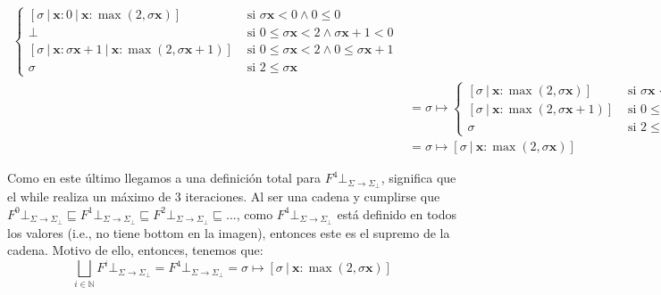 \documentclass{article}
\newcommand{\N}{\mathbb{N}}
\newcommand{\x}{\textbf{x}}
\newcommand{\supr}{\bigsqcup\limits}
\newcommand{\fleq}{\sqsubseteq}
\newcommand{\cdom}{\Sigma \to \Sigma_\bot}
\newcommand{\cfbot}{\bot_{\cdom}}
\begin{document}
\begin{equation*}
\begin{aligned}
\begin{cases}
                   [\sigma\ |\ \x : 0\ |\ \x : \max(2, \sigma\x)] &\text{ si } \sigma\x < 0 \land 0 \leq 0 \\ 
                   \bot &\text{ si }0 \leq \sigma\x < 2 \land \sigma\x+1 < 0 \\ 
                   [\sigma\ |\ \x : \sigma\x+1\ |\ \x : \max(2,\sigma\x+1)] &\text{ si }0 \leq \sigma\x < 2 \land 0 \leq \sigma\x+1 \\ 
                   \sigma &\text{ si }2 \leq \sigma\x
                 \end{cases} \\ 
                 &= \sigma \mapsto \begin{cases}
                   [\sigma\ |\ \x : \max(2, \sigma \x)] &\text{ si }\sigma \x < 0 \\ 
                   [\sigma\ |\ \x : \max(2, \sigma\x+1)] &\text{ si }0 \leq \sigma\x < 2 \\ 
                   \sigma &\text{ si }2 \leq \sigma\x 
                 \end{cases} \\ 
                 &= \sigma \mapsto [\sigma\ |\ \x : \max(2, \sigma\x)]
  \end{aligned}
\end{equation*}

Como en este último llegamos a una definición total para $F^4 \cfbot$, significa que el while realiza un máximo de $3$ iteraciones.
Al ser una cadena y cumplirse que $F^0 \cfbot \fleq F^1 \cfbot \fleq F^2 \cfbot \fleq \dots$, como $F^4 \cfbot$ está definido en todos los valores (i.e., no tiene bottom en la imagen), entonces este es el supremo de la cadena.
Motivo de ello, entonces, tenemos que:
\begin{equation*}
  \supr_{i \in \N} F^i \cfbot = F^4 \cfbot = \sigma \mapsto [\sigma\ |\ \x : \max(2, \sigma\x)]
\end{equation*}
\end{document}
